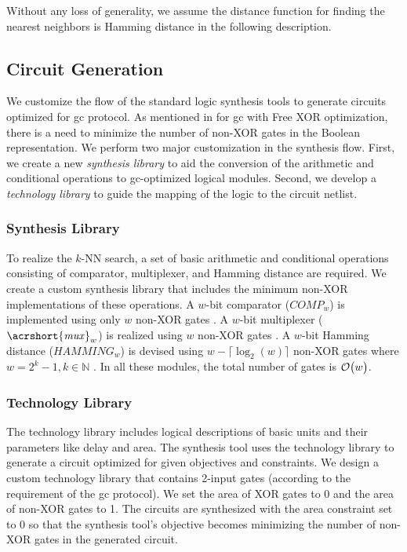 Without any loss of generality, we assume the distance function for finding the nearest neighbors is Hamming distance in the following description.

\subsection{Circuit Generation}\label{ssec:knn-circuitgen}
We customize the flow of the standard logic synthesis tools to generate circuits optimized for \acrshort{gc} protocol.
As mentioned in  for \acrshort{gc} with Free XOR optimization, there is a need to minimize the number of non-XOR gates in the Boolean representation.
We perform two major customization in the synthesis flow.
First, we create a new \emph{synthesis library} to aid the conversion of the arithmetic and conditional operations to \acrshort{gc}-optimized logical modules.
Second, we develop a \emph{technology library} to guide the mapping of the logic to the circuit \gls{netlist}.

\subsubsection{Synthesis Library}
To realize the $k$-NN search, a set of basic arithmetic and conditional operations consisting of comparator, multiplexer, and Hamming distance are required.
We create a custom synthesis library that includes the minimum non-XOR implementations of these operations.
A $w$-bit comparator ($\mathit{COMP}_w$) is implemented using only $w$ non-XOR gates \cite{kolesnikov2009improved}.
A $w$-bit multiplexer ($\mathit{\acrshort{mux}}_w$) is realized using $w$ non-XOR gates \cite{kolesnikov2008improved}.
A $w$-bit Hamming distance ($\mathit{HAMMING}_w$) is devised using $w-\lceil \log _2(w) \rceil$ non-XOR gates where $w=2^k-1, k \in \mathbb{N}$ \cite{boyar2006concrete}.
In all these modules, the total number of gates is $\mathcal{O}\bigl(w\bigr)$.

\subsubsection{Technology Library}
The technology library includes logical descriptions of basic units and their parameters like delay and area.
The synthesis tool uses the technology library to generate a circuit optimized for given objectives and constraints.
We design a custom technology library that contains 2-input gates (according to the requirement of the \acrshort{gc} protocol).
We set the area of XOR gates to 0 and the area of non-XOR gates to 1.
The circuits are synthesized with the area constraint set to 0 so that the synthesis tool's objective becomes minimizing the number of non-XOR gates in the generated circuit.

